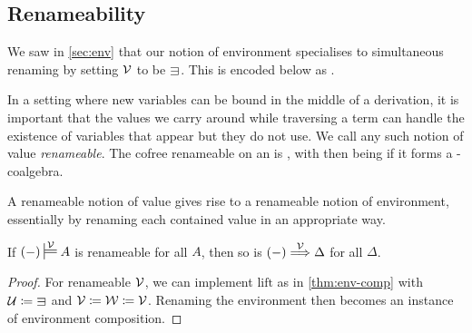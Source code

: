 

\subsection{Renameability}

We saw in \cref{sec:env} that our notion of environment specialises to
simultaneous renaming by setting $\mathcal V$ to be $\sqni$.
This is encoded below as
.


In a setting where new variables can be bound in the middle of a derivation,
it is important that the values we carry around while traversing a term can
handle the existence of variables that appear but they do not use.
We call any such notion of value \emph{renameable}.
The cofree renameable  on an 
 is \AgdaSpace{}, with
 then being  if it forms a
-coalgebra.


A renameable notion of value gives rise to a renameable notion of environment,
essentially by renaming each contained value in an appropriate way.

\begin{lemma}\label{thm:env-ren}
  If $\plr{-} \sdtstile{}\V A$ is renameable for all $A$, then so is
  $\plr{-} \env\V \Delta$ for all $\Delta$.
\end{lemma}
\begin{proof}
  For renameable $\mathcal V$, we can implement $\mathrm{lift}$ as in
  \cref{thm:env-comp} with $\U \coloneqq {\sqni}$ and
  $\mathcal V \coloneqq \mathcal W \coloneqq \mathcal V$.
  Renaming the environment then becomes an instance of environment composition.
\end{proof}
